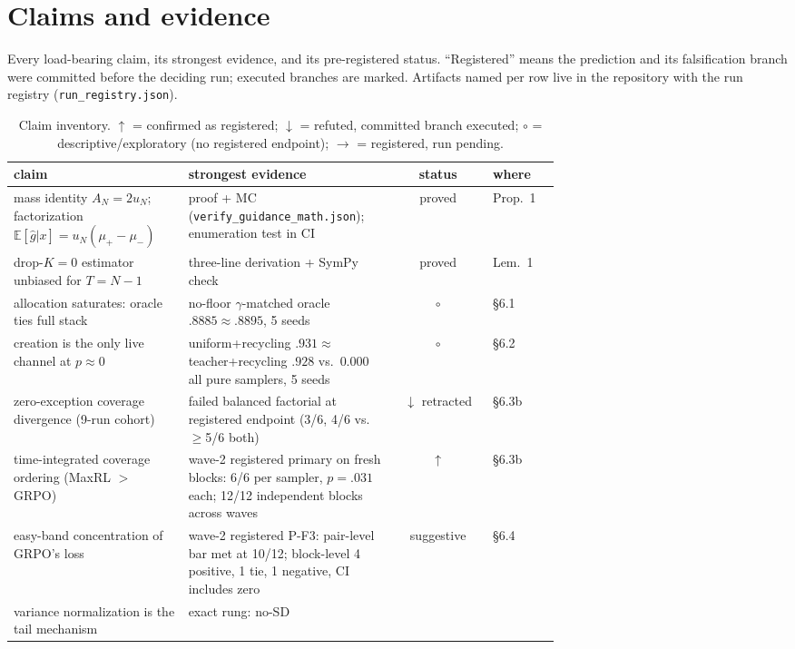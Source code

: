 \section{Claims and evidence}\label{app:claims}

Every load-bearing claim, its strongest evidence, and its
pre-registered status. ``Registered'' means the prediction and its
falsification branch were committed before the deciding run; executed
branches are marked. Artifacts named per row live in the repository
with the run registry (\texttt{run\_registry.json}).

\begin{table}[h]
\centering\footnotesize
\setlength{\tabcolsep}{3.5pt}
\caption{Claim inventory. $\uparrow$ = confirmed as registered;
$\downarrow$ = refuted, committed branch executed; $\circ$ =
descriptive/exploratory (no registered endpoint); $\rightarrow$ =
registered, run pending.}
\label{tab:claims}
\begin{tabular}{@{}p{0.32\linewidth}p{0.38\linewidth}cl@{}}
\toprule
claim & strongest evidence & status & where \\
\midrule
mass identity $A_N = 2u_N$; factorization
$\mathbb{E}[\hat g|x] = u_N(\mu_+{-}\mu_-)$ & proof + MC
(\texttt{verify\_guidance\_math.json}); enumeration test in CI &
proved & Prop.~1 \\
drop-$K{=}0$ estimator unbiased for $T{=}N{-}1$ & three-line
derivation + SymPy check & proved & Lem.~1 \\
allocation saturates: oracle ties full stack & no-floor
$\gamma$-matched oracle $.8885 \approx .8895$, 5 seeds & $\circ$ &
\S 6.1 \\
creation is the only live channel at $p{\approx}0$ &
uniform+recycling $.931 \approx$ teacher+recycling $.928$ vs.\
$0.000$ all pure samplers, 5 seeds & $\circ$ & \S 6.2 \\
zero-exception coverage divergence (9-run cohort) & failed balanced
factorial at registered endpoint (3/6, 4/6 vs.\ $\ge$5/6 both) &
$\downarrow$ retracted & \S 6.3b \\
time-integrated coverage ordering (MaxRL $>$ GRPO) & wave-2
registered primary on fresh blocks: 6/6 per sampler, $p{=}.031$
each; 12/12 independent blocks across waves & $\uparrow$ & \S 6.3b \\
easy-band concentration of GRPO's loss & wave-2 registered P-F3:
pair-level bar met at 10/12; block-level 4 positive, 1 tie, 1 negative,
CI includes zero & suggestive & \S 6.4 \\
variance normalization is the tail mechanism & exact rung: no-SD

\end{tabular}
\end{table}
